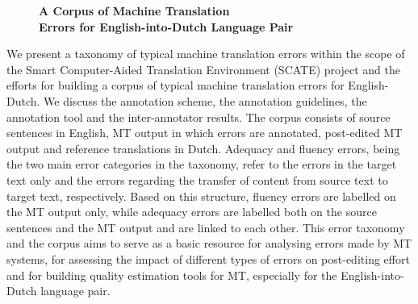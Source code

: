 \documentclass[10pt, a4paper, twopage, headinclude, footinclude, BCOR5mm]{book}
\begin{document}
\newpage

\begin{figure}[t!]
\centering
\large\textbf{A Corpus of Machine Translation \\ Errors for English-into-Dutch Language Pair}
\vspace*{0.5cm}
\end{figure}


\begin{table}[t!]
\end{table} 
\begin{table}[t!]
\end{table} 
\noindent
We present a taxonomy of typical machine translation errors within the scope of the Smart Computer-Aided Translation Environment (SCATE) project and the efforts for building a corpus of typical machine translation errors for English-Dutch.  We discuss the annotation scheme, the annotation guidelines, the annotation tool and the inter-annotator results.   The corpus consists of source sentences in English, MT output in which errors are annotated, post-edited MT output and reference translations in Dutch. Adequacy and fluency errors, being the two main error categories in the taxonomy, refer to the errors in the target text only and the errors regarding the transfer of content from source text to target text, respectively. Based on this structure, fluency errors are labelled on the MT output only, while adequacy errors are labelled both on the source sentences and the MT output and are linked to each other.   This error taxonomy and the corpus aims to serve as a basic resource for analysing errors made by MT systems, for assessing the impact of different types of errors on post-editing effort and for building quality estimation tools for MT, especially for the English-into-Dutch language pair.   
\end{document}
